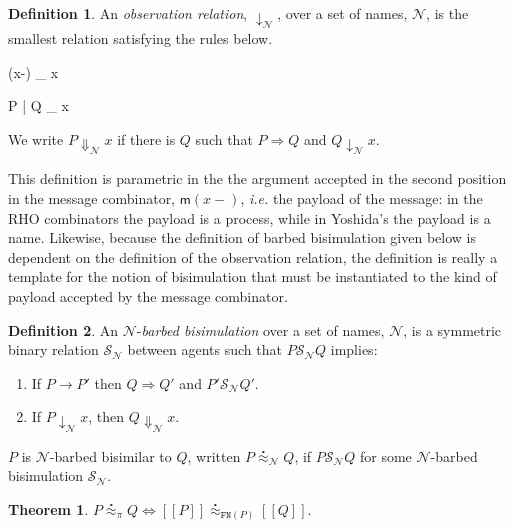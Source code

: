 \documentclass[submission,copyright,creativecommons]{eptcs}
\newcommand{\ldb}{[\![}
\newcommand{\rdb}{]\!]}
\newcommand{\wbbisim}{\stackrel{\centerdot}{\approx}} %
\newcommand{\nameeq}{\mathbin{\equiv_N}}
\newcommand{\binpar}[2]{#1 | #2}
\newcommand{\prefix}[3]{\mathsf{for}(#2 \leftarrow #1?) #3}
\newcommand{\red}{\rightarrow}
\newcommand{\wred}{\Rightarrow}
\newcommand{\rhoc}{$\rho$-calculus}
\theoremstyle{definition}
\newtheorem{definition}{Definition}
\newtheorem{theorem}{Theorem}
\theoremstyle{remark}
\theoremstyle{remark}
\begin{document}
\begin{definition}
An \emph{observation relation}, $\downarrow_{\mathcal{N}}$, over a set
of names, $\mathcal N$, is the smallest relation satisfying the rules
below.

\infrule[Out-barb]{y \in {\mathcal N}, \; x \nameeq y}
    {(x-) \downarrow_{} x}

    {\binpar{P}{Q} \downarrow_{} x}

We write $P \Downarrow_{\mathcal{N}} x$ if there is $Q$ such that 
$P \wred Q$ and $Q \downarrow_{\mathcal{N}} x$.
\end{definition}

This definition is parametric in the the argument accepted in the
second position in the message combinator, $\mathsf{m}(x-)$, {\em i.e.} the payload
of the message: in the RHO combinators the payload is a process,
while in Yoshida's the payload is a name. Likewise, because the
definition of barbed bisimulation given below is dependent on the
definition of the observation relation, the definition is really a
template for the notion of bisimulation that must be instantiated to
the kind of payload accepted by the message combinator.


\begin{definition}
An  ${\mathcal N}$-\emph{barbed bisimulation} over a set of names, ${\mathcal N}$, is a symmetric binary relation 
${\mathcal S}_{\mathcal N}$ between agents such that $P{\mathcal S}_{\mathcal N}Q$ implies:
\begin{enumerate}
\item If $P \red P'$ then $Q \wred Q'$ and $P'{\mathcal S}_{\mathcal N} Q'$.
\item If $P\downarrow_{\mathcal N} x$, then $Q\Downarrow_{\mathcal N} x$.
\end{enumerate}
$P$ is ${\mathcal N}$-barbed bisimilar to $Q$, written
$P \wbbisim_{\mathcal N} Q$, if $P {\mathcal S}_{\mathcal N} Q$ for some ${\mathcal N}$-barbed bisimulation ${\mathcal S}_{\mathcal N}$.
\end{definition}

\begin{theorem}
  $P \wbbisim_{\pi} Q \iff \ldb P \rdb \wbbisim_{\texttt{FN}(P)} \ldb Q \rdb$.
\end{theorem}
\end{document}
